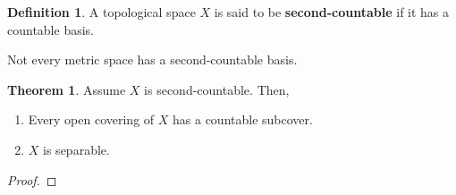 \documentclass{article}
\theoremstyle{definition}
\newtheorem{definition}{Definition}
\newtheorem{theorem}{Theorem}[section]
\begin{document}
\begin{definition}
    A topological space $X$ is said to be \textbf{second-countable} if it
    has a countable basis.
\end{definition}

Not every metric space has a second-countable basis. 

\begin{theorem}
    Assume $X$ is second-countable. Then,

    \begin{enumerate}
        \item Every open covering of $X$ has a countable subcover.
        \item $X$ is separable.
    \end{enumerate}
\end{theorem}

\begin{proof}
    
\end{proof}

\newpage
\end{document}
